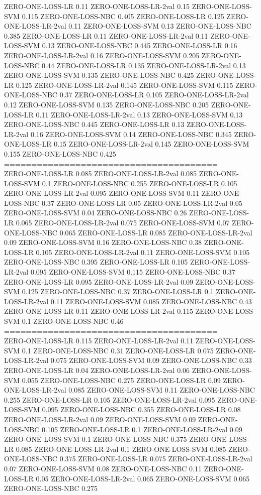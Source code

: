 \documentclass[12pt]{article}
\begin{document}
ZERO-ONE-LOSS-LR 0.11
ZERO-ONE-LOSS-LR-2val 0.15
ZERO-ONE-LOSS-SVM 0.115
ZERO-ONE-LOSS-NBC 0.405
ZERO-ONE-LOSS-LR 0.125
ZERO-ONE-LOSS-LR-2val 0.11
ZERO-ONE-LOSS-SVM 0.13
ZERO-ONE-LOSS-NBC 0.385
ZERO-ONE-LOSS-LR 0.11
ZERO-ONE-LOSS-LR-2val 0.11
ZERO-ONE-LOSS-SVM 0.13
ZERO-ONE-LOSS-NBC 0.445
ZERO-ONE-LOSS-LR 0.16
ZERO-ONE-LOSS-LR-2val 0.16
ZERO-ONE-LOSS-SVM 0.205
ZERO-ONE-LOSS-NBC 0.44
ZERO-ONE-LOSS-LR 0.135
ZERO-ONE-LOSS-LR-2val 0.13
ZERO-ONE-LOSS-SVM 0.135
ZERO-ONE-LOSS-NBC 0.425
ZERO-ONE-LOSS-LR 0.125
ZERO-ONE-LOSS-LR-2val 0.145
ZERO-ONE-LOSS-SVM 0.115
ZERO-ONE-LOSS-NBC 0.37
ZERO-ONE-LOSS-LR 0.105
ZERO-ONE-LOSS-LR-2val 0.12
ZERO-ONE-LOSS-SVM 0.135
ZERO-ONE-LOSS-NBC 0.205
ZERO-ONE-LOSS-LR 0.11
ZERO-ONE-LOSS-LR-2val 0.13
ZERO-ONE-LOSS-SVM 0.13
ZERO-ONE-LOSS-NBC 0.445
ZERO-ONE-LOSS-LR 0.13
ZERO-ONE-LOSS-LR-2val 0.16
ZERO-ONE-LOSS-SVM 0.14
ZERO-ONE-LOSS-NBC 0.345
ZERO-ONE-LOSS-LR 0.15
ZERO-ONE-LOSS-LR-2val 0.145
ZERO-ONE-LOSS-SVM 0.155
ZERO-ONE-LOSS-NBC 0.425\\

=======================================\\

ZERO-ONE-LOSS-LR 0.085
ZERO-ONE-LOSS-LR-2val 0.085
ZERO-ONE-LOSS-SVM 0.1
ZERO-ONE-LOSS-NBC 0.255
ZERO-ONE-LOSS-LR 0.105
ZERO-ONE-LOSS-LR-2val 0.095
ZERO-ONE-LOSS-SVM 0.11
ZERO-ONE-LOSS-NBC 0.37
ZERO-ONE-LOSS-LR 0.05
ZERO-ONE-LOSS-LR-2val 0.05
ZERO-ONE-LOSS-SVM 0.04
ZERO-ONE-LOSS-NBC 0.26
ZERO-ONE-LOSS-LR 0.065
ZERO-ONE-LOSS-LR-2val 0.075
ZERO-ONE-LOSS-SVM 0.07
ZERO-ONE-LOSS-NBC 0.065
ZERO-ONE-LOSS-LR 0.085
ZERO-ONE-LOSS-LR-2val 0.09
ZERO-ONE-LOSS-SVM 0.16
ZERO-ONE-LOSS-NBC 0.38
ZERO-ONE-LOSS-LR 0.105
ZERO-ONE-LOSS-LR-2val 0.11
ZERO-ONE-LOSS-SVM 0.105
ZERO-ONE-LOSS-NBC 0.395
ZERO-ONE-LOSS-LR 0.105
ZERO-ONE-LOSS-LR-2val 0.095
ZERO-ONE-LOSS-SVM 0.115
ZERO-ONE-LOSS-NBC 0.37
ZERO-ONE-LOSS-LR 0.095
ZERO-ONE-LOSS-LR-2val 0.09
ZERO-ONE-LOSS-SVM 0.125
ZERO-ONE-LOSS-NBC 0.37
ZERO-ONE-LOSS-LR 0.1
ZERO-ONE-LOSS-LR-2val 0.11
ZERO-ONE-LOSS-SVM 0.085
ZERO-ONE-LOSS-NBC 0.43
ZERO-ONE-LOSS-LR 0.11
ZERO-ONE-LOSS-LR-2val 0.115
ZERO-ONE-LOSS-SVM 0.1
ZERO-ONE-LOSS-NBC 0.46\\

=======================================\\

ZERO-ONE-LOSS-LR 0.115
ZERO-ONE-LOSS-LR-2val 0.11
ZERO-ONE-LOSS-SVM 0.1
ZERO-ONE-LOSS-NBC 0.31
ZERO-ONE-LOSS-LR 0.075
ZERO-ONE-LOSS-LR-2val 0.075
ZERO-ONE-LOSS-SVM 0.09
ZERO-ONE-LOSS-NBC 0.33
ZERO-ONE-LOSS-LR 0.04
ZERO-ONE-LOSS-LR-2val 0.06
ZERO-ONE-LOSS-SVM 0.055
ZERO-ONE-LOSS-NBC 0.275
ZERO-ONE-LOSS-LR 0.09
ZERO-ONE-LOSS-LR-2val 0.085
ZERO-ONE-LOSS-SVM 0.11
ZERO-ONE-LOSS-NBC 0.255
ZERO-ONE-LOSS-LR 0.105
ZERO-ONE-LOSS-LR-2val 0.095
ZERO-ONE-LOSS-SVM 0.095
ZERO-ONE-LOSS-NBC 0.355
ZERO-ONE-LOSS-LR 0.08
ZERO-ONE-LOSS-LR-2val 0.09
ZERO-ONE-LOSS-SVM 0.09
ZERO-ONE-LOSS-NBC 0.105
ZERO-ONE-LOSS-LR 0.1
ZERO-ONE-LOSS-LR-2val 0.09
ZERO-ONE-LOSS-SVM 0.1
ZERO-ONE-LOSS-NBC 0.375
ZERO-ONE-LOSS-LR 0.085
ZERO-ONE-LOSS-LR-2val 0.1
ZERO-ONE-LOSS-SVM 0.085
ZERO-ONE-LOSS-NBC 0.375
ZERO-ONE-LOSS-LR 0.075
ZERO-ONE-LOSS-LR-2val 0.07
ZERO-ONE-LOSS-SVM 0.08
ZERO-ONE-LOSS-NBC 0.11
ZERO-ONE-LOSS-LR 0.05
ZERO-ONE-LOSS-LR-2val 0.065
ZERO-ONE-LOSS-SVM 0.065
ZERO-ONE-LOSS-NBC 0.275\\
\end{document}
